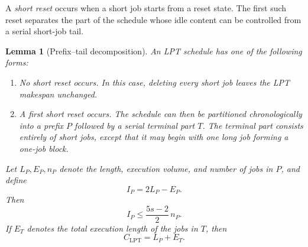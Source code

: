 \documentclass[11pt]{article}
\newtheorem{lemma}{Lemma}
\begin{document}
A \emph{short reset} occurs when a short job starts from a reset state. The
first such reset separates the part of the schedule whose idle content can be
controlled from a serial short-job tail.

\begin{lemma}[Prefix--tail decomposition]
\label{lem:lpt-prefix-tail}
An LPT schedule has one of the following forms:

\begin{enumerate}
\item No short reset occurs. In this case, deleting every short job leaves the
      LPT makespan unchanged.
\item A first short reset occurs. The schedule can then be partitioned
      chronologically into a prefix \(P\) followed by a serial terminal part
      \(T\). The terminal part consists entirely of short jobs, except that it
      may begin with one long job forming a one-job block.
\end{enumerate}

Let \(L_P,E_P,n_P\) denote the length, execution volume, and number of jobs in
\(P\), and define
\[
I_P=2L_P-E_P.
\]
Then
\begin{equation}
I_P\le\frac{5s-2}{2}\,n_P.
\label{eq:lpt-prefix-idle}
\end{equation}
If \(E_T\) denotes the total execution length of the jobs in \(T\), then
\begin{equation}
C_{\mathrm{LPT}}=L_P+E_T.
\label{eq:lpt-prefix-tail-length}
\end{equation}
\end{lemma}
\end{document}
